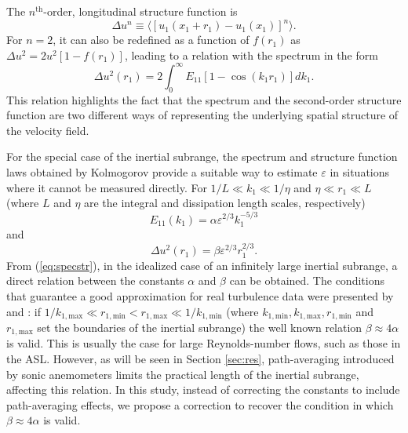 \documentclass{svjour3}                     %
\begin{document}
The $n^{\text{th}}$-order, longitudinal structure function is 
\begin{equation}
  \Delta u^n \equiv \langle [u_1(x_1+r_1) - u_1(x_1)]^n \rangle.
\end{equation}
For $n = 2$, it can also be redefined as a function of $f(r_1)$ as $\Delta u^2 =
2u^2[1-f(r_1)]$, leading to a relation with the
spectrum in the form \citep[][p. 226]{Pop2000}
\begin{equation}
  \Delta u^2(r_1) = 2 \int_0^\infty E_{11} \left[1 - \cos(k_1r_1) \right] dk_1. \label{eq:specstr}
\end{equation}
This relation highlights the fact that the spectrum and the
second-order structure function are two different ways of representing
the underlying spatial structure of the velocity field.

For the special case of the inertial subrange, the spectrum and structure function laws obtained by Kolmogorov provide a suitable way to estimate $\varepsilon$ in situations where it cannot be measured directly. For $1/L \ll k_1 \ll 1/\eta$ and $\eta \ll r_1 \ll L$ (where $L$ and $\eta$ are the integral and dissipation length scales, respectively)
\begin{equation}
  E_{11}(k_1) = \alpha \varepsilon^{2/3} k_1^{-5/3}\label{eq:spec}
\end{equation}
and 
\begin{equation}
  \Delta u^2(r_1) = \beta \varepsilon^{2/3} r_1^{2/3}. \label{eq:strfun}
\end{equation}
From (\ref{eq:specstr}), in the idealized case of an infinitely large
inertial subrange, a direct relation between the constants $\alpha$
and $\beta$ can be obtained. The conditions that guarantee a good
approximation for real turbulence data were presented by
\citet{Web1964} and \citet[][p. 356]{MonYag1981}: if
$1/k_{1,\mathrm{max}} \ll r_{1,\mathrm{min}} < r_{1,\mathrm{max}} \ll
1/k_{1,\mathrm{min}}$ (where $k_{1,\mathrm{min}}, k_{1,\mathrm{max}},
r_{1,\mathrm{min}}$ and $r_{1,\mathrm{max}}$ set the boundaries of the
inertial subrange) the well known relation $\beta \approx 4\alpha$
\citep[][p. 232]{Pop2000} is valid. This is usually the case for
large Reynolds-number flows, such as those in the ASL. However, as
will be seen in Section \ref{sec:res}, path-averaging introduced by
sonic anemometers limits the practical length of the inertial
subrange, affecting this relation. In this study, instead of
correcting the constants to include path-averaging effects, we propose
a correction to recover the condition in which $\beta \approx 4\alpha$
is valid.
\end{document}
